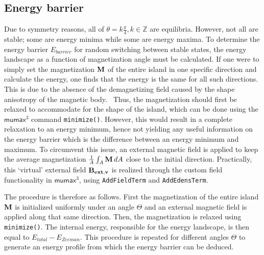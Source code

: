 \documentclass[11pt,a4paper,english]{article}
\newcommand{\code}[1]{\texttt{#1}}
\newcommand{\mumax}{$\mathsf{mumax}^3$}
\begin{document}
\subsection{Energy barrier}
\label{par:Biaxial_EnergyBarrier}
Due to symmetry reasons, all of $\theta = k\frac{\pi}{4} , k\in\mathbb{Z}$ are equilibria. However, not all are stable; some are energy minima while some are energy maxima. To determine the energy barrier $E_{barrier}$ for random switching between stable states, the energy landscape as a function of magnetization angle must be calculated. If one were to simply set the magnetization $\vb{M}$ of the entire island in one specific direction and calculate the energy, one finds that the energy is the same for all such directions. This is due to the absence of the demagnetizing field caused by the shape anisotropy of the magnetic body.~\cite{Nonmonotonic_reversal} Thus, the magnetization should first be relaxed to accommodate for the shape of the island, which can be done using the \mumax{} command \code{minimize()}. However, this would result in a complete relaxation to an energy minimum, hence not yielding any useful information on the energy barrier which is the difference between an energy minimum and maximum. To circumvent this issue, an external magnetic field is applied to keep the average magnetization $\frac{1}{A}\int_A \vb{M}\,dA$ close to the initial direction. Practically, this `virtual' external field $\vb{B_{ext,v}}$ is realized through the custom field functionality in \mumax{}, using \code{AddFieldTerm} and \code{AddEdensTerm}. \par
The procedure is therefore as follows. First the magnetization of the entire island $\vb{M}$ is initialized uniformly under an angle $\Theta$ and an external magnetic field is applied along that same direction. Then, the magnetization is relaxed using \code{minimize()}. The internal energy, responsible for the energy landscape, is then equal to $E_{total} - E_{Zeeman}$. This procedure is repeated for different angles $\Theta$ to generate an energy profile from which the energy barrier can be deduced.
\end{document}
